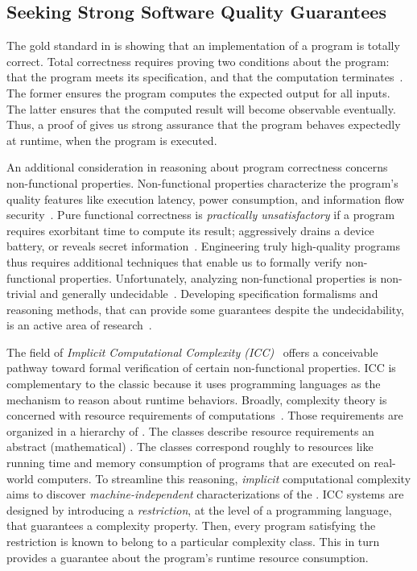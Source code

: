 \subsection{Seeking Strong Software Quality Guarantees}
\label{sec:aicc-intro}

The gold standard in  is showing that an implementation
of a program is {totally correct}. Total correctness
requires proving two conditions about the program: that the program meets its
specification, and that the computation
terminates~\cite{leino2023}. The former ensures the program computes the
expected output for all inputs. The latter ensures that the computed result will
become observable {eventually}. Thus, a proof of  gives
us strong assurance that the program behaves expectedly at runtime, \ie when the
program is executed.

An additional consideration in reasoning about program correctness concerns
{non-functional} properties. Non-functional
properties characterize the program's quality features like execution latency,
power consumption, and information flow security~\cite{terbeek2018}. Pure
functional correctness is \emph{practically unsatisfactory} if a program
requires exorbitant time to compute its result; aggressively drains a device
battery, or reveals secret information~\cite{heraud2011,aubert20222}.
Engineering truly high-quality programs thus requires additional techniques that
enable us to formally verify non-functional properties. Unfortunately, analyzing
non-functional properties is non-trivial and generally
undecidable~\cite{rice1953}. Developing specification
formalisms and reasoning methods, that can provide some guarantees despite the
undecidability, is an active area of research~\cite{etaps2025}.

The field of \emph{Implicit Computational Complexity (ICC)}~\cite{dallago2011}
offers a conceivable pathway toward formal verification of certain
non-functional properties. ICC is complementary to the classic  because it uses programming languages as the {mechanism} to reason about
runtime behaviors. Broadly, complexity theory is concerned with resource
requirements of computations~\cite{goldreich2008}. Those requirements are
organized in a hierarchy of . The classes describe
resource requirements \wrt an abstract (mathematical) . The
classes correspond roughly to resources like running time and memory consumption
of programs that are executed on real-world computers. To streamline this
reasoning, \emph{implicit} computational complexity aims to discover
\emph{machine-independent} characterizations of the .
ICC systems are designed by introducing a \emph{restriction}, at the level of a
programming language, that guarantees a complexity property. Then, every program
satisfying the restriction is known to belong to a particular complexity class.
This in turn provides a guarantee about the program's runtime resource
consumption.

